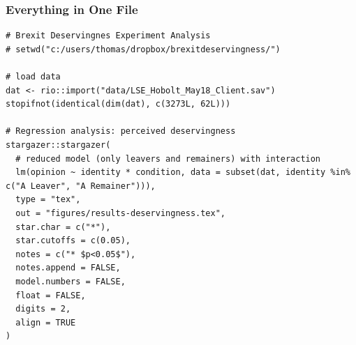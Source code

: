 \documentclass[14pt]{beamer}
\begin{document}






\begin{frame}[fragile]
\frametitle{Everything in One File}

\scriptsize

\begin{verbatim}
# Brexit Deservingnes Experiment Analysis
# setwd("c:/users/thomas/dropbox/brexitdeservingness/")

# load data
dat <- rio::import("data/LSE_Hobolt_May18_Client.sav")
stopifnot(identical(dim(dat), c(3273L, 62L)))

# Regression analysis: perceived deservingness
stargazer::stargazer(
  # reduced model (only leavers and remainers) with interaction
  lm(opinion ~ identity * condition, data = subset(dat, identity %in% c("A Leaver", "A Remainer"))),
  type = "tex",
  out = "figures/results-deservingness.tex",
  star.char = c("*"),
  star.cutoffs = c(0.05),
  notes = c("* $p<0.05$"),
  notes.append = FALSE,
  model.numbers = FALSE,
  float = FALSE,
  digits = 2,
  align = TRUE
)
\end{verbatim}
\end{frame}
\end{document}
